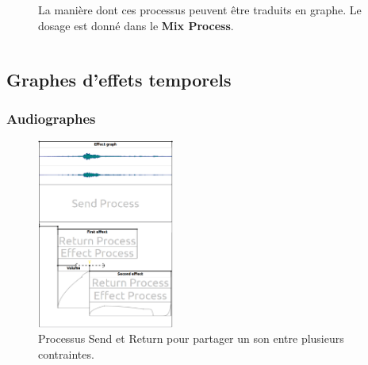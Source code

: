 \documentclass{beamer}
\begin{document}
\begin{frame}
\begin{columns}
\begin{column}{0.5\textwidth}
\begin{figure}
				\caption{La manière dont ces processus peuvent être traduits en graphe. 
					Le dosage est donné dans le \textbf{Mix Process}.}
			\end{figure}
		\end{column}
	\end{columns}
\end{frame}

\subsection{Graphes d'effets temporels}
\begin{frame}
	\frametitle{Audiographes}    
	\Large
	\begin{figure}
		\centering
		\includegraphics[width=0.4\textwidth]{images/ex3.png}
		\caption{Processus Send et Return pour partager un son entre plusieurs contraintes.}
	\end{figure}
\end{frame}
\end{document}
